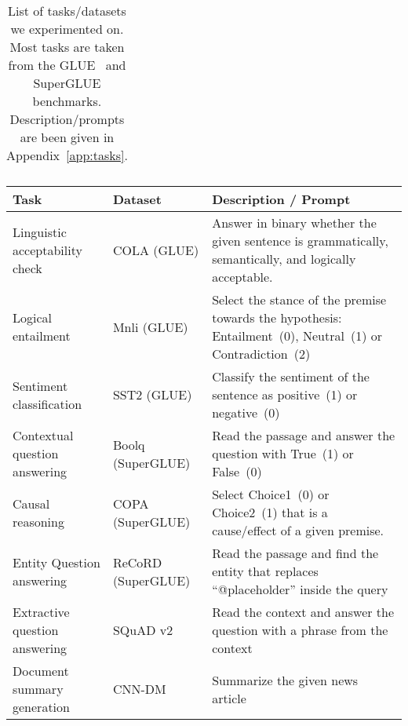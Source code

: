 \begin{table}[!t]
\begin{tabular}{p{40mm}|p{28.5mm}}
    \bottomrule
    \end{tabular}
    \caption{List of tasks/datasets we experimented on. Most tasks are taken from the GLUE~\cite{wangglue} and SuperGLUE\cite{wang2019superglue} benchmarks. Description/prompts are been given in Appendix~\ref{app:tasks}.}
    \label{tab:tasks}
\end{table}









\iffalse 
\begin{table*}[ht]
    \centering
    \footnotesize
    \begin{tabular}{p{45mm}|p{28mm}|p{70mm}}
    \toprule
    \textbf{Task} &
    \textbf{Dataset} & \textbf{Description / Prompt} \\
    \midrule
    Linguistic acceptability check & COLA (GLUE) \cite{wangglue} & Answer in binary whether the given sentence is grammatically, semantically, and logically acceptable. \\
    Logical entailment & Mnli (GLUE) \cite{wangglue} & Select the stance of the premise towards the hypothesis: Entailment~(0), Neutral~(1) or Contradiction~(2) \\
    Sentiment classification & SST2 (GLUE) \cite{wangglue} & Classify the sentiment of the sentence as positive~(1) or negative~(0) \\
    \hline
    Contextual question answering & Boolq (SuperGLUE) \cite{wang2019superglue} & Read the passage and answer the question with True~(1) or False~(0) \\
    Causal reasoning & COPA (SuperGLUE) \cite{wang2019superglue} & Select Choice1~(0) or Choice2~(1) that is a cause/effect of a given premise. \\
    Entity Question answering & ReCoRD (SuperGLUE) \cite{wang2019superglue} & Read the passage and find the entity that replaces ``@placeholder'' inside the query \\
    Extractive question answering & SQuAD v2 \cite{rajpurkar-etal-2016-squad} & Read the context and answer the question with a phrase from the context \\
    \hline
    Document summary generation & CNN-DM \cite{nallapati2016abstractive} & Summarize the given news article \\

\end{tabular}
\end{table*}

